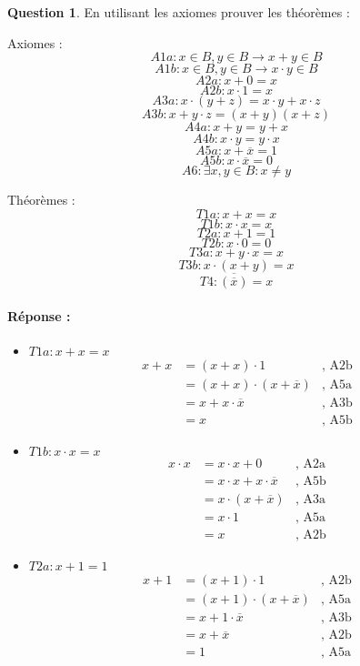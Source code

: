 \documentclass[11pt,a4paper]{article}
\theoremstyle{definition}%
\newtheorem{Q}{Question}[] %
\newcommand{\reponse}[1]{%
	\ifthenelse {\boolean{corrige}} {\paragraph{Réponse :} \color{darkblue}   #1\color{black}} {}
 }
\begin{document}
\begin{Q}
	En utilisant les axiomes prouver les théorèmes :

\begin{minipage}[t]{0.5\linewidth}
	\centering Axiomes :
	$$A1a : x \in B, y \in B \rightarrow x+y \in B$$
	$$A1b : x \in B, y \in B \rightarrow x \cdot y \in B$$
	$$A2a : x+0 = x$$
	$$A2b : x \cdot 1 = x$$
	$$A3a : x \cdot (y+z) = x \cdot y+x \cdot z$$
	$$A3b : x+y \cdot z = (x+y)(x+z)$$
	$$A4a : x+y = y+x$$
	$$A4b : x \cdot y = y \cdot x$$
	$$A5a : x+\overline{x} = 1$$
	$$A5b : x \cdot \overline{x} = 0$$
	$$A6 : \exists x, y \in B : x \neq y$$
\end{minipage}
\begin{minipage}[t]{0.5\linewidth}
	\centering Théorèmes :
	$$T1a : x+x=x$$
	$$T1b : x \cdot x=x$$
	$$T2a : x+1=1$$
	$$T2b : x \cdot 0=0$$
	$$T3a : x+y \cdot x=x$$
	$$T3b : x \cdot (x+y)=x$$
	$$T4 : \overline{(\overline{x})}=x$$
\end{minipage}

\reponse{
\begin{itemize}
	\item $T1a : x+x=x$
	\begin{align*}
		x + x & = (x + x) \cdot 1&\mbox{, A2b}\\
		& = (x + x) \cdot (x + \overline{x})&\mbox{, A5a}\\
		& = x + x \cdot \overline{x}&\mbox{, A3b}\\
		& = x &\mbox{, A5b}
	\end{align*}

	\item $T1b : x \cdot x=x$
	\begin{align*}
		x \cdot x & = x \cdot x  + 0&\mbox{, A2a}\\
		& = x\cdot x + x \cdot \overline{x} &\mbox{, A5b}\\
		& = x \cdot (x + \overline{x}) &\mbox{, A3a} \\
		& = x \cdot 1&\mbox{, A5a}\\
		& = x&\mbox{, A2b}
	\end{align*}

	\item $T2a : x+1=1$
	\begin{align*}
		x + 1 & = (x+1) \cdot 1&\mbox{, A2b}\\
		& = (x+1) \cdot (x+\overline{x})&\mbox{, A5a}\\
		& = x + 1 \cdot \overline{x} &\mbox{, A3b}\\
		& = x + \overline{x} &\mbox{, A2b}\\
		& = 1 &\mbox{, A5a}
	\end{align*}


\end{itemize}}
\end{Q}
\end{document}

